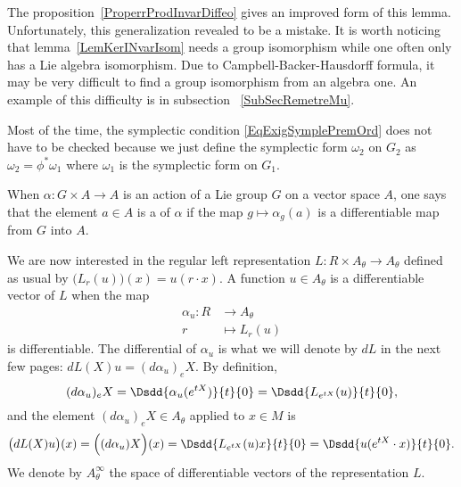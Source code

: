 The proposition~\ref{ProperrProdInvarDiffeo} gives an improved form of this lemma. Unfortunately, this generalization revealed to be a mistake. It is worth noticing that lemma~\ref{LemKerINvarIsom} needs a group isomorphism while one often only has a Lie algebra isomorphism. Due to Campbell-Backer-Hausdorff formula, it may be very difficult to find a group isomorphism from an algebra one. An example of this difficulty is in subsection ~\ref{SubSecRemetreMu}.


\begin{remark}
	Most of the time, the symplectic condition \eqref{EqExigSymplePremOrd} does not have to be checked because we just define the symplectic form $\omega_2$ on $G_2$ as $\omega_2=\phi^*\omega_1$ where $\omega_1$ is the symplectic form on $G_1$.
\end{remark}

\begin{definition}
	When $\alpha\colon G\times A\to A$ is an action of a Lie group $G$ on a vector space $A$, one says that the element $a\in A$ is a  of $\alpha$ if the map $g\mapsto\alpha_g(a)$ is a differentiable map from $G$ into $A$.
\end{definition}

We are now interested in the regular left representation $L\colon R\times A_{\theta}\to  A_{\theta}$ defined as usual by $\big( L_r(u) \big)(x)=u(r\cdot x)$. A function $u\in A_{\theta}$ is a differentiable vector of $L$ when the map
\begin{equation}
	\begin{aligned}
		\alpha_u\colon R & \to  A_{\theta} \\
		r                & \mapsto L_r(u)
	\end{aligned}
\end{equation}
is differentiable. The differential of $\alpha_u$ is what we will denote by $dL$ in the next few pages: $dL(X)u=(d\alpha_u)_eX$. By definition,
\[
	(d\alpha_u)_eX=\Dsdd{ \alpha_u( e^{tX}) }{t}{0}=\Dsdd{ L_{ e^{tX}}(u) }{t}{0},
\]
and the element $(d\alpha_u)_eX\in A_{\theta}$ applied to $x\in M$ is
\begin{equation}
	\big( dL(X)u \big)(x) =\Big( (d\alpha_u)X \Big)(x)=\Dsdd{ L_{ e^{tX}}(u)x }{t}{0}=\Dsdd{ u( e^{tX}\cdot x) }{t}{0}.
\end{equation}
We denote by $ A_{\theta}^{\infty}$ the space of differentiable vectors of the representation $L$.

